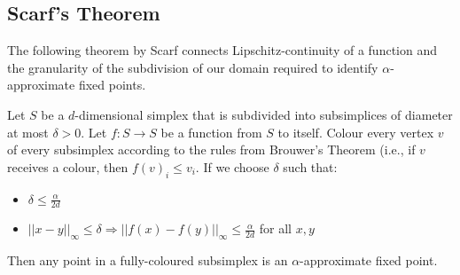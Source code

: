 \subsection{Scarf's Theorem}
The following theorem by Scarf connects Lipschitz-continuity of a function and
the granularity of the subdivision of our domain required to identify
$\alpha$-approximate fixed points.

\begin{theorem}[Scarf's]
	Let $S$ be a $d$-dimensional simplex that is subdivided into subsimplices
	of diameter at most $\delta > 0$. Let $f:S \rightarrow S$ be a function
	from $S$ to itself. Colour every vertex $v$ of every subsimplex according
	to the rules from Brouwer's Theorem (i.e., if $v$ receives a colour, then
	$f(v)_i \le v_i$. If we choose $\delta$ such that:
	\begin{itemize}
		\item $\delta \le \frac{\alpha}{2d}$
		\item $||x-y||_\infty \le \delta \Rightarrow ||f(x)-f(y)||_\infty \le
			\frac{\alpha}{2d}$ for all $x,y$
	\end{itemize}
	Then any point in a fully-coloured subsimplex is an $\alpha$-approximate
	fixed point.
\end{theorem}

